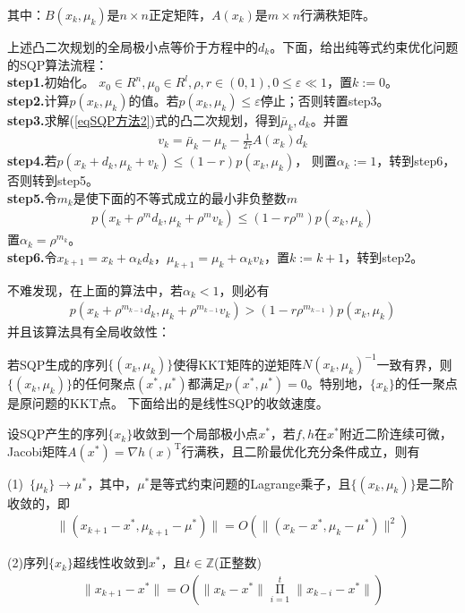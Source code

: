             其中：$B(x_k,{\mu}_k)$是$n\times n$正定矩阵，$A(x_k)$是$m\times n$行满秩矩阵。
            \par
            上述凸二次规划的全局极小点等价于方程中的$d_k$。下面，给出纯等式约束优化问题的SQP算法流程：\\
            \textbf{step1.}初始化。
            $x_0 \in R^n,{\mu}_0 \in R^l,\rho,r \in (0,1),0 \leqslant \varepsilon \ll 1$，置$k:=0$。\\
            \textbf{step2.}计算$p(x_k,{\mu}_k)$的值。若$p(x_k,{\mu}_k) \leqslant \varepsilon$停止；否则转置step3。\\
            \textbf{step3.}求解(\ref{eqSQP方法2})式的凸二次规划，得到$\bar{\mu}_k,d_{k}$。并置
            \begin{align*}
             v_k=\bar{\mu}_k-{\mu}_k-\frac{1}{2\tau}A(x_k)d_{k}
            \end{align*}
            \textbf{step4.}若$p(x_k+d_k,{\mu}_k+v_k) \leqslant (1-r)p(x_k,{\mu}_k)$，
            则置${\alpha}_k:=1$，转到step6，否则转到step5。\\
            \textbf{step5.}令$m_k$是使下面的不等式成立的最小非负整数$m$
            \begin{align*}
             p(x_k+{\rho}^md_k,{\mu}_k+{\rho}^mv_k) \leqslant (1-r{\rho}^m)p(x_k,{\mu}_k)
            \end{align*}
            置${\alpha}_k={\rho}^{m_k}$。\\
            \textbf{step6.}令$x_{k+1}=x_k+{\alpha}_kd_k$，${\mu}_{k+1}={\mu}_k+{\alpha}_kv_k$，置$k:=k+1$，转到step2。
            \par
            不难发现，在上面的算法中，若${\alpha}_k < 1$，则必有
            \begin{align*}
             p(x_k+{\rho}^{m_{k-1}}d_k,{\mu}_k+{\rho}^{m_{k-1}}v_k) > (1-r{\rho}^{m_{k-1}})p(x_k,{\mu}_k)
            \end{align*}
            并且该算法具有全局收敛性：
            \par
            若SQP生成的序列$\{(x_k,{\mu}_k)\}$使得KKT矩阵的逆矩阵$N(x_k,{\mu}_k)^{-1}$一致有界，则$\{(x_k,{\mu}_k)\}$的任何聚点$(x^*,{\mu}^*)$都满足$p(x^*,{\mu}^*)=0$。特别地，$\{x_k\}$的任一聚点是原问题的KKT点。
            下面给出的是线性SQP的收敛速度。
            \par
            设SQP产生的序列$\{x_k\}$收敛到一个局部极小点$x^*$，若$f,h$在$x^*$附近二阶连续可微，Jacobi矩阵$A(x^*)=\nabla h(x)^\mathrm{T} $行满秩，且二阶最优化充分条件成立，则有
            \par
            (1)\ $\{{\mu}_k\} \to {\mu}^*$，其中，${\mu}^*$是等式约束问题的Lagrange乘子，且$\{(x_k,{\mu}_k)\}$是二阶收敛的，即
            \begin{align*}
             \|(x_{k+1}-x^*,{\mu}_{k+1}-{\mu}^*)\|=O(\|(x_{k}-x^*,{\mu}_{k}-{\mu}^*)\|^2)
            \end{align*}
            \par
            (2)序列$\{x_k\}$超线性收敛到$x^*$，且$t \in \mathbb{Z}$(正整数)
            \begin{align*}
             \|x_{k+1}-x^*\|=O(\|x_{k}-x^*\|\mathop {\Pi}\limits_{i=1}^t\|x_{k-i}-x^*\|)
            \end{align*}
